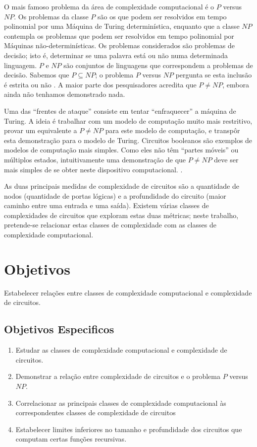 O mais famoso problema da área de complexidade computacional
é o $P$ versus $NP$.
Os problemas da classe $P$
são os que podem ser resolvidos em tempo polinomial
por uma Máquina de Turing determinística,
enquanto que a classe $NP$
contempla os problemas que podem ser resolvidos em tempo polinomial
por Máquinas não-determinísticas.
Os problemas considerados são problemas de decisão;
isto é,
determinar se uma palavra está ou não
numa determinada linguagem.
$P$ e $NP$ são conjuntos de linguagens
que correspondem a problemas de decisão.
Sabemos que $P \subseteq NP$;
o problema $P$ versus $NP$
pergunta se esta inclusão é estrita ou não \cite{Sipser2006}.
A maior parte dos pesquisadores acredita que $P \neq NP$,
embora ainda não tenhamos demonstrado nada.

Uma das ``frentes de ataque''
consiste em tentar ``enfraquecer''
a máquina de Turing.
A ideia é trabalhar com um modelo de computação muito mais restritivo,
provar um equivalente a $P \neq NP$
para este modelo de computação,
e transpôr esta demonstração para o modelo de Turing.
Circuitos booleanos
são exemplos de modelos de computação mais simples.
Como eles não têm ``partes móveis''
ou múltiplos estados,
intuitivamente uma demonstração de que $P \neq NP$
deve ser mais simples de se obter
neste dispositivo computacional. \cite{Hastad1987}.

As duas principais medidas
de complexidade de circuitos
são a quantidade de nodos
(quantidade de portas lógicas)
e a profundidade do circuito
(maior caminho entre uma entrada e uma saída).
Existem várias classes de complexidades de circuitos
que exploram estas duas métricas;
neste trabalho,
pretende-se relacionar estas classes de complexidade
com as classes de complexidade computacional.

\section{Objetivos}

Estabelecer relações entre classes de complexidade computacional
e complexidade de circuitos.

\subsection{Objetivos Especificos}

\begin{enumerate}
    \item Estudar as classes de complexidade computacional
        e complexidade de circuitos.
    \item Demonstrar a relação entre complexidade de circuitos
        e o problema $P$ versus $NP$.
    \item Correlacionar as principais classes
        de complexidade computacional
        às correspondentes classes de complexidade de circuitos
    \item Estabelecer limites inferiores no tamanho
        e profundidade dos circuitos
        que computam certas funções recursivas.
\end{enumerate}

